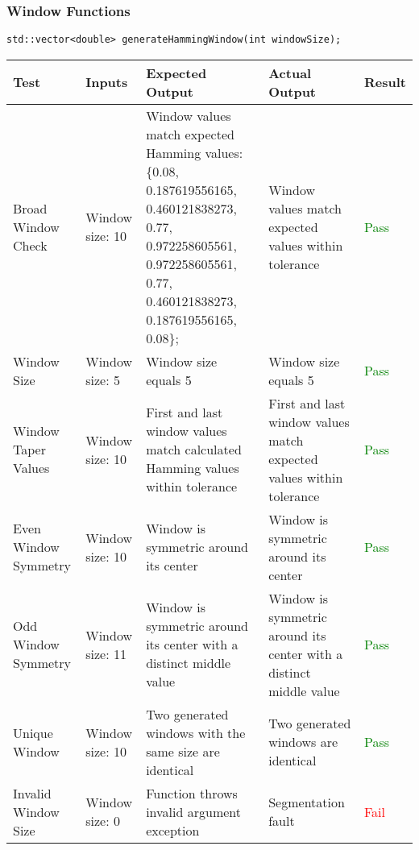 \documentclass[12pt, titlepage]{article}
\begin{document}
\subsubsection{Window Functions}
\texttt{std::vector<double> generateHammingWindow(int windowSize);}\\
\begin{longtable}{|L{3cm}|L{3cm}|L{2.5cm}|L{2.5cm}|l|}
  \hline
  \textbf{Test} & \textbf{Inputs} & \textbf{Expected Output} & \textbf{Actual Output} & \textbf{Result} \\
  \hline
  Broad Window Check &
    Window size: 10 &
    Window values match expected Hamming values: \{0.08, 0.187619556165, 
    0.460121838273, 0.77, 0.972258605561, 0.972258605561, 
    0.77, 0.460121838273, 0.187619556165, 0.08\};&
    Window values match expected values within tolerance &
    \textcolor{green}{Pass} \\
  \hline
  Window Size &
    Window size: 5 &
    Window size equals 5 &
    Window size equals 5 &
    \textcolor{green}{Pass} \\
  \hline
  Window Taper Values &
    Window size: 10 &
    First and last window values match calculated Hamming values within tolerance &
    First and last window values match expected values within tolerance &
    \textcolor{green}{Pass} \\
  \hline
  Even Window Symmetry &
    Window size: 10 &
    Window is symmetric around its center &
    Window is symmetric around its center &
    \textcolor{green}{Pass} \\
  \hline
  Odd Window Symmetry &
    Window size: 11 &
    Window is symmetric around its center with a distinct middle value &
    Window is symmetric around its center with a distinct middle value &
    \textcolor{green}{Pass} \\
  \hline
  Unique Window &
    Window size: 10 &
    Two generated windows with the same size are identical &
    Two generated windows are identical &
    \textcolor{green}{Pass} \\
  \hline
  Invalid Window Size &
    Window size: 0 &
    Function throws invalid argument exception &
    Segmentation fault &
    \textcolor{red}{Fail} \\
  \hline
\end{longtable}
\end{document}
